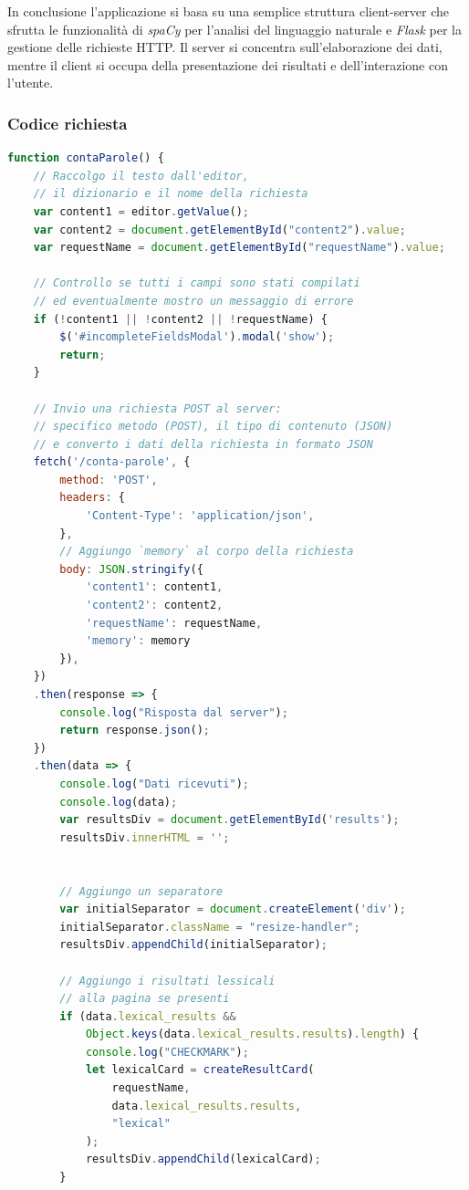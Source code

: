 \documentclass[12pt]{report}
\newcommand{\flask}{\textsl{Flask}\xspace}
\newcommand{\spacy}{\textsl{spaCy}\xspace}
\newcommand{\http}{\textsf{HTTP}\xspace}
\begin{document}
In conclusione l'applicazione si basa su una semplice struttura client-server che sfrutta le funzionalità di \spacy per l'analisi del linguaggio naturale e \flask per la gestione delle richieste \http. Il server si concentra sull'elaborazione dei dati, mentre il client si occupa della presentazione dei risultati e dell'interazione con l'utente.


\subsubsection{Codice richiesta}
\begin{lstlisting}[language=JavaScript]
function contaParole() {
    // Raccolgo il testo dall'editor,
    // il dizionario e il nome della richiesta
    var content1 = editor.getValue();
    var content2 = document.getElementById("content2").value;
    var requestName = document.getElementById("requestName").value;

    // Controllo se tutti i campi sono stati compilati
    // ed eventualmente mostro un messaggio di errore
    if (!content1 || !content2 || !requestName) {
        $('#incompleteFieldsModal').modal('show');
        return;
    }

    // Invio una richiesta POST al server:
    // specifico metodo (POST), il tipo di contenuto (JSON)
    // e converto i dati della richiesta in formato JSON
    fetch('/conta-parole', {
        method: 'POST',
        headers: {
            'Content-Type': 'application/json',
        },
        // Aggiungo `memory` al corpo della richiesta
        body: JSON.stringify({
            'content1': content1,
            'content2': content2,
            'requestName': requestName,
            'memory': memory
        }),
    })
    .then(response => {
        console.log("Risposta dal server");
        return response.json();
    })
    .then(data => {
        console.log("Dati ricevuti");
        console.log(data);
        var resultsDiv = document.getElementById('results');
        resultsDiv.innerHTML = '';


        // Aggiungo un separatore
        var initialSeparator = document.createElement('div');
        initialSeparator.className = "resize-handler";
        resultsDiv.appendChild(initialSeparator);

        // Aggiungo i risultati lessicali
        // alla pagina se presenti
        if (data.lexical_results &&
            Object.keys(data.lexical_results.results).length) {
            console.log("CHECKMARK");
            let lexicalCard = createResultCard(
                requestName,
                data.lexical_results.results,
                "lexical"
            );
            resultsDiv.appendChild(lexicalCard);
        }


\end{lstlisting}
\end{document}
